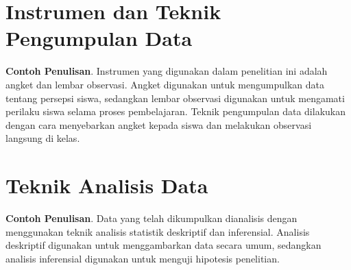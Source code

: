 \section{Instrumen dan Teknik Pengumpulan Data}
\textbf{Contoh Penulisan}. Instrumen yang digunakan dalam penelitian ini adalah angket dan lembar observasi. Angket digunakan untuk mengumpulkan data tentang persepsi siswa, sedangkan lembar observasi digunakan untuk mengamati perilaku siswa selama proses pembelajaran. Teknik pengumpulan data dilakukan dengan cara menyebarkan angket kepada siswa dan melakukan observasi langsung di kelas.

\section{Teknik Analisis Data}
\textbf{Contoh Penulisan}. Data yang telah dikumpulkan dianalisis dengan menggunakan teknik analisis statistik deskriptif dan inferensial. Analisis deskriptif digunakan untuk menggambarkan data secara umum, sedangkan analisis inferensial digunakan untuk menguji hipotesis penelitian.



